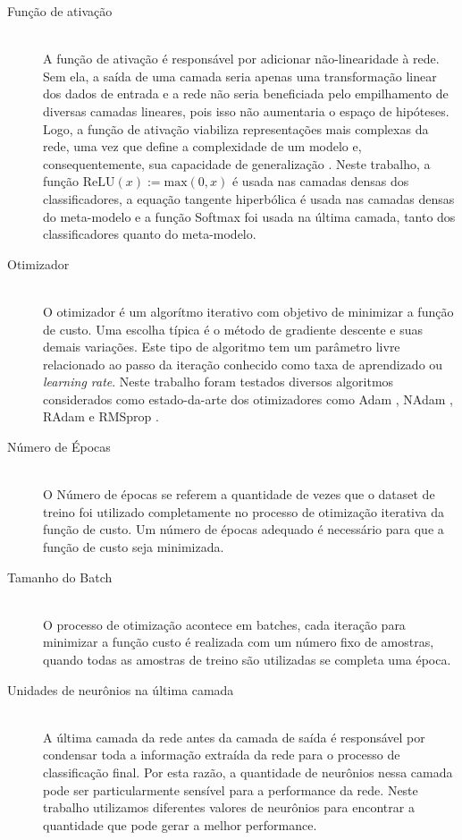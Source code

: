 \begin{description}
  \item[Função de ativação] \hfill \\
        A função de ativação é responsável por adicionar não-linearidade à rede. Sem ela, a saída de uma camada seria apenas uma transformação linear dos dados de entrada e a rede não seria beneficiada pelo empilhamento de diversas camadas lineares, pois isso não aumentaria o espaço de hipóteses. Logo, a função de ativação viabiliza representações mais complexas da rede, uma vez que define a complexidade de um modelo e, consequentemente, sua capacidade de generalização \cite{CholletBook}. Neste trabalho, a função $\textrm{ReLU}(x) := \textrm{max}(0, x)$ é usada nas camadas densas dos classificadores, a equação tangente hiperbólica é usada nas camadas densas do meta-modelo e a função Softmax \cite{Bridle1990} foi usada na última camada, tanto dos classificadores quanto do meta-modelo.

  \item[Otimizador] \hfill \\
        O otimizador é um algorítmo iterativo com objetivo de minimizar a função de custo. Uma escolha típica é o método de gradiente descente e suas demais variações. Este tipo de algoritmo tem um parâmetro livre relacionado ao passo da iteração conhecido como taxa de aprendizado ou \textit{learning rate}. Neste trabalho foram testados diversos algoritmos considerados como estado-da-arte dos otimizadores como Adam \cite{Adam}, NAdam \cite{NAdam}, RAdam \cite{RAdam} e RMSprop \cite{RMSprop}.

  \item[Número de Épocas] \hfill \\
        O Número de épocas se referem a quantidade de vezes que o dataset de treino foi utilizado completamente no processo de otimização iterativa da função de custo. Um número de épocas adequado é necessário para que a função de custo seja minimizada.

  \item[Tamanho do Batch] \hfill \\
        O processo de otimização acontece em batches, cada iteração para minimizar a função custo é realizada com um número fixo de amostras, quando todas as amostras de treino são utilizadas se completa uma época.

  \item[Unidades de neurônios na última camada]
        \hfill \\
        A última camada da rede antes da camada de saída é responsável por condensar toda a informação extraída da rede para o processo de classificação final. Por esta razão, a quantidade de neurônios nessa camada pode ser particularmente sensível para a performance da rede. Neste trabalho utilizamos diferentes valores de neurônios para encontrar a quantidade que pode gerar a melhor performance.


\end{description}
